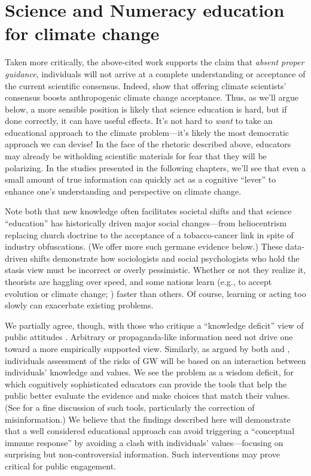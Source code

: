 \section{Science and Numeracy education for climate change}

Taken more critically, the above-cited work supports the claim that \emph{absent
proper guidance}, individuals will not arrive at a complete understanding or
acceptance of the current scientific consensus.  Indeed,
\textcite{lewandowsky_pivotal_2013} show that offering climate scientists'
consensus boosts anthropogenic climate change acceptance.  Thus, as we'll argue
below, a more sensible position is likely that science education is hard, but if
done correctly, it can have useful effects.  It's not hard to \emph{want} to
take an educational approach to the climate problem---it's likely the most
democratic approach we can devise! In the face of the rhetoric described above,
educators may already be witholding scientific materials for fear that they will
be polarizing. In the studies presented in the following chapters, we'll see
that even a small amount of true information can quickly act as a cognitive
``lever'' to enhance one's understanding and perspective on climate change.

Note both that new knowledge often facilitates societal shifts and that science
``education'' has historically driven major social changes—from heliocentrism
replacing church doctrine to the acceptance of a tobacco-cancer link in spite of
industry obfuscations. (We offer more such germane evidence below.) These
data-driven shifts demonstrate how sociologists and social psychologists who
hold the stasis view must be incorrect or overly pessimistic. Whether or not
they realize it, theorists are haggling over speed, and some nations learn
(e.g., to accept evolution or climate change; \cite{ranney_why_2012}) faster than others.
Of course, learning or acting too slowly can exacerbate existing problems.

We partially agree, though, with those who critique a ``knowledge deficit'' view
of public attitudes \parencite[cf.][]{dickson_case_2005}. Arbitrary or
propaganda-like information need not drive one toward a more empirically
supported view. Similarly, as argued by both \textcite{kahan_polarizing_2012}
and \textcite{ranney_why_2012}, individuals assessment of the risks of GW will
be based on an interaction between individuals' knowledge and values. We see the
problem as a wisdom deficit, for which cognitively sophisticated educators can
provide the tools that help the public better evaluate the evidence and make
choices that match their values. (See \cite{lewandowsky_misinformation_2012} for
a fine discussion of such tools, particularly the correction of misinformation.)
We believe that the findings described here will demonstrate that a well
considered educational approach can avoid triggering a “conceptual immune
response” by avoiding a clash with individuals' values---focusing on surprising
but non-controversial information. Such interventions may prove critical for
public engagement.

